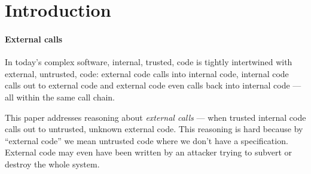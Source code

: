 
\section{Introduction}
\label{s:intro}

\paragraph{External calls}

In today's complex software, internal, trusted, code  is tightly intertwined  with external, untrusted, code: external code
calls into internal code, internal code calls
out to external code  and external code  even calls back  into internal code --- all within the same call chain.


This paper addresses reasoning about \emph{external calls} --- when
trusted internal code calls out to untrusted, unknown external code.
This reasoning is hard because by ``external code'' we mean untrusted
code where we don't have a specification.
External code
may even have been written by an attacker trying to subvert or destroy the whole system.  
%
 

\vspace*{1mm}


